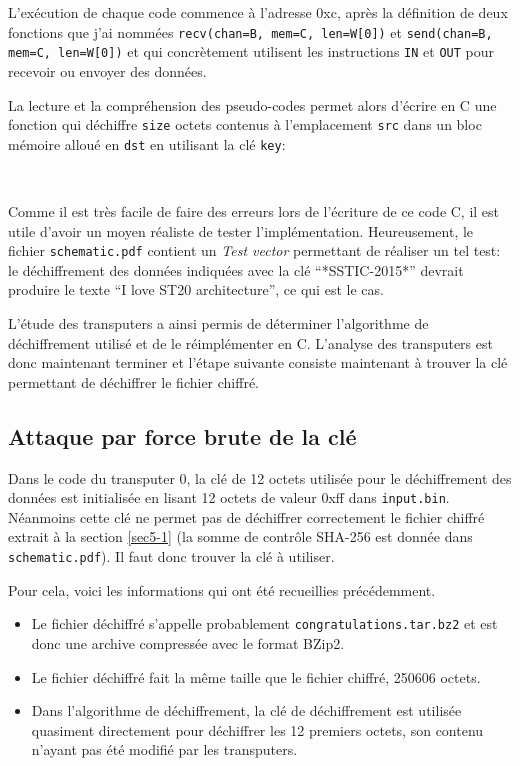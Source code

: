 \documentclass[a4paper,10pt]{article}
\newcommand{\pyinput}[1]{%
    \noindent{\color[rgb]{0.5, 0.5, 0.5}{\rule{\textwidth}{0.4pt}}}
     \\
    \noindent{\color[rgb]{0.5, 0.5, 0.5}{\rule{\textwidth}{0.4pt}}}
}
\begin{document}
L'exécution de chaque code commence à l'adresse 0xc, après la définition de deux fonctions que j'ai nommées \texttt{recv(chan=B, mem=C, len=W[0])} et \texttt{send(chan=B, mem=C, len=W[0])} et qui concrètement utilisent les instructions \texttt{IN} et \texttt{OUT} pour recevoir ou envoyer des données.

La lecture et la compréhension des pseudo-codes permet alors d'écrire en C une fonction qui déchiffre \texttt{size} octets contenus à l'emplacement \texttt{src} dans un bloc mémoire alloué en \texttt{dst} en utilisant la clé \texttt{key}:

\pyinput{stage5/decrypt-transputers.c.inc.tex}

Comme il est très facile de faire des erreurs lors de l'écriture de ce code C, il est utile d'avoir un moyen réaliste de tester l'implémentation.
Heureusement, le fichier \texttt{schematic.pdf} contient un \emph{Test vector} permettant de réaliser un tel test: le déchiffrement des données indiquées avec la clé ``*SSTIC-2015*'' devrait produire le texte ``I love ST20 architecture'', ce qui est le cas.

L'étude des transputers a ainsi permis de déterminer l'algorithme de déchiffrement utilisé et de le réimplémenter en C.
L'analyse des transputers est donc maintenant terminer et l'étape suivante consiste maintenant à trouver la clé permettant de déchiffrer le fichier chiffré.

\subsection{Attaque par force brute de la clé}

Dans le code du transputer 0, la clé de 12 octets utilisée pour le déchiffrement des données est initialisée en lisant 12 octets de valeur 0xff dans \texttt{input.bin}.
Néanmoins cette clé ne permet pas de déchiffrer correctement le fichier chiffré extrait à la section \ref{sec5-1} (la somme de contrôle SHA-256 est donnée dans \texttt{schematic.pdf}).
Il faut donc trouver la clé à utiliser.

Pour cela, voici les informations qui ont été recueillies précédemment.
\begin{itemize}
  \item Le fichier déchiffré s'appelle probablement \texttt{congratulations.tar.bz2} et est donc une archive compressée avec le format BZip2.
  \item Le fichier déchiffré fait la même taille que le fichier chiffré, 250606 octets.
  \item Dans l'algorithme de déchiffrement, la clé de déchiffrement est utilisée quasiment directement pour déchiffrer les 12 premiers octets, son contenu n'ayant pas été modifié par les transputers.
\end{itemize}
\end{document}
